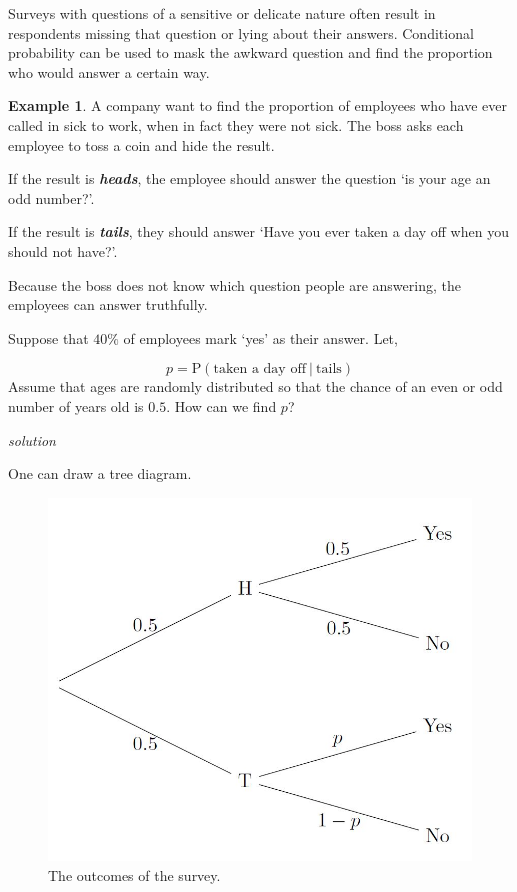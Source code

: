 \documentclass[
]{book}
\theoremstyle{definition}
\theoremstyle{definition}
\newtheorem{example}{Example}[chapter]
\theoremstyle{definition}
\theoremstyle{definition}
\theoremstyle{remark}
\begin{document}
Surveys with questions of a sensitive or delicate nature often result in respondents missing that question or lying about their answers. Conditional probability can be used to mask the awkward question and find the proportion who would answer a certain way.

\begin{example}
A company want to find the proportion of employees who have ever called in sick to work, when in fact they were not sick. The boss asks each employee to toss a coin and hide the result.

If the result is \textbf{\emph{heads}}, the employee should answer the question `is your age an odd number?'.

If the result is \textbf{\emph{tails}}, they should answer `Have you ever taken a day off when you should not have?'.

Because the boss does not know which question people are answering, the employees can answer truthfully.

Suppose that \(40\%\) of employees mark `yes' as their answer. Let,

\[p= \text{P}(\text{taken a day off} \ | \ \text{tails})\]
Assume that ages are randomly distributed so that the chance of an even or odd number of years old is \(0.5\). How can we find \(p\)?
\end{example}

\emph{solution}

One can draw a tree diagram.

\begin{figure}

{\centering \includegraphics[width=11.54in]{./figures/survey} 

}

\caption{The outcomes of the survey.}\label{fig:tree3}
\end{figure}
\end{document}
